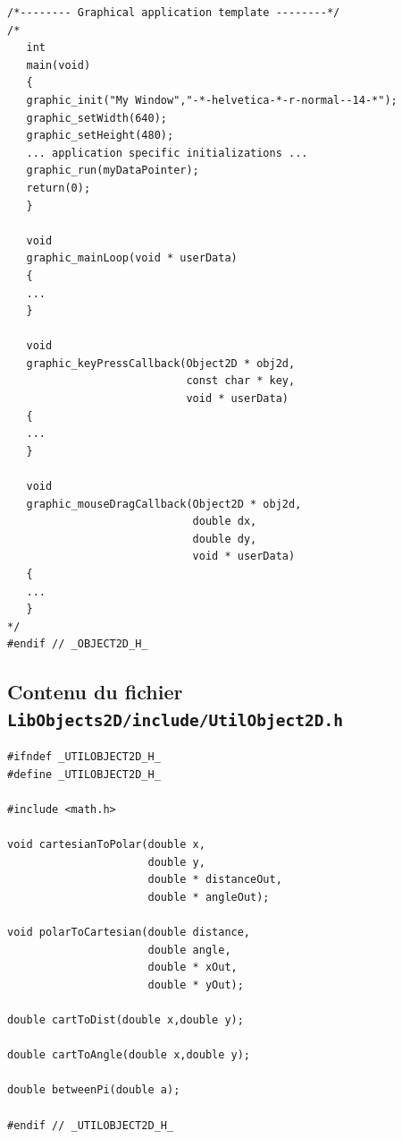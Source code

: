 \documentclass[12pt]{article}
\begin{document}
\begin{small}
\begin{verbatim}
/*-------- Graphical application template --------*/
/*
   int
   main(void)
   {
   graphic_init("My Window","-*-helvetica-*-r-normal--14-*");
   graphic_setWidth(640);
   graphic_setHeight(480);
   ... application specific initializations ...
   graphic_run(myDataPointer);
   return(0);
   }

   void
   graphic_mainLoop(void * userData)
   {
   ...
   }

   void
   graphic_keyPressCallback(Object2D * obj2d,
                            const char * key,
                            void * userData)
   {
   ...
   }

   void
   graphic_mouseDragCallback(Object2D * obj2d,
                             double dx,
                             double dy,
                             void * userData)
   {
   ...
   }
*/
#endif // _OBJECT2D_H_
\end{verbatim}
\end{small}

\subsection{Contenu du fichier {\tt LibObjects2D/include/UtilObject2D.h}}

\begin{small}
\begin{verbatim}
#ifndef _UTILOBJECT2D_H_
#define _UTILOBJECT2D_H_

#include <math.h>

void cartesianToPolar(double x,
                      double y,
                      double * distanceOut,
                      double * angleOut);

void polarToCartesian(double distance,
                      double angle,
                      double * xOut,
                      double * yOut);

double cartToDist(double x,double y);

double cartToAngle(double x,double y);

double betweenPi(double a);

#endif // _UTILOBJECT2D_H_
\end{verbatim}
\end{small}

\fi  %
\end{document}
